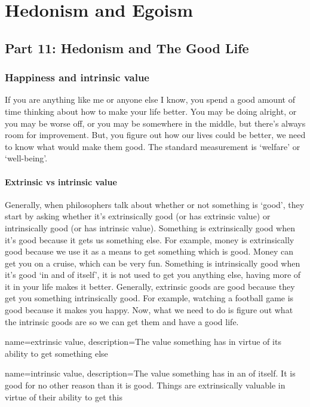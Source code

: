 \part{Hedonism and Egoism}
\label{ch.mod4}
\chapter{Part 11: Hedonism and The Good Life}

\section{Happiness and intrinsic value}

If you are anything like me or anyone else I know, you spend a good amount of time thinking about how to make your life better. You may be doing alright, or you may be worse off, or you may be somewhere in the middle, but there’s always room for improvement. But, you figure out how our lives could be better, we need to know what would make them good. The standard measurement is ‘welfare’ or ‘well-being’.
\subsection{Extrinsic vs intrinsic value}

Generally, when philosophers talk about whether or not something is ‘good’, they start by asking whether it’s extrinsically good (or has \gls{extrinsic value}) or intrinsically good (or has \gls{intrinsic value}). Something is extrinsically good when it’s good because it gets us something else. For example, money is extrinsically good because we use it as a means to get something which is good. Money can get you on a cruise, which can be very fun. Something is intrinsically good when it’s good ‘in and of itself’, it is not used to get you anything else, having more of it in your life makes it better. Generally, extrinsic goods are good because they get you something intrinsically good. For example, watching a football game is good because it makes you happy. Now, what we need to do is figure out what the intrinsic goods are so we can get them and have a good life.

{
  name=extrinsic value,
  description={The value something has in virtue of its ability to get something else}
}

{
  name=intrinsic value,
  description={The value something has in an of itself. It is good for no other reason than it is good. Things are extrinsically valuable in virtue of their ability to get this}
}

